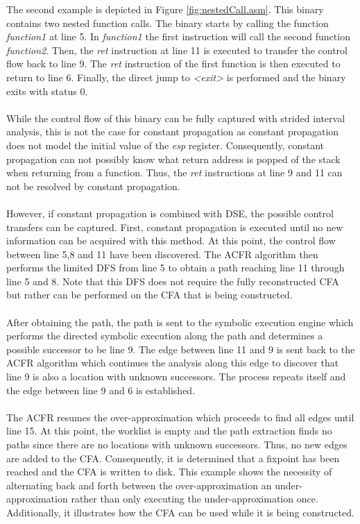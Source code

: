 \documentclass{kththesis}
\renewcommand{\it}[1]{\textit{#1}}
\begin{document}
\clearpage
\noindent
The second example is depicted in Figure \ref{fig:nestedCall.asm}. This binary contains two nested function calls. The binary starts by calling the function \it{function1} at line 5. In \it{function1} the first instruction will call the second function \it{function2}. Then, the \it{ret} instruction at line 11 is executed to transfer the control flow back to line 9. The \it{ret} instruction of the first function is then executed to return to line 6. Finally, the direct jump to \it{<exit>} is performed and the binary exits with status $0$.
\\ \\
While the control flow of this binary can be fully captured with strided interval analysis, this is not the case for constant propagation as constant propagation does not model the initial value of the \it{esp} register. Consequently, constant propagation can not possibly know what return address is popped of the stack when returning from a function. Thus, the \it{ret} instructions at line 9 and 11 can not be resolved by constant propagation. 
\\ \\
However, if constant propagation is combined with DSE, the possible control transfers can be captured. First, constant propagation is executed until no new information can be acquired with this method. At this point, the control flow between line 5,8 and 11 have been discovered. The ACFR algorithm then performs the limited DFS from line 5 to obtain a path reaching line 11 through line 5 and 8. Note that this DFS does not require the fully reconstructed CFA but rather can be performed on the CFA that is being constructed.
\\ \\
After obtaining the path, the path is sent to the symbolic execution engine which performs the directed symbolic execution along the path and determines a possible successor to be line 9. The edge between line 11 and 9 is sent back to the ACFR algorithm which continues the analysis along this edge to discover that line 9 is also a location with unknown successors. The process repeats itself and the edge between line 9 and 6 is established. 
\\ \\
The ACFR resumes the over-approximation which proceeds to find all edges until line 15. At this point, the worklist is empty and the path extraction finds no paths since there are no locations with unknown successors. Thus, no new edges are added to the CFA. Consequently, it is determined that a fixpoint has been reached and the CFA is written to disk. This example shows the necessity of alternating back and forth between the over-approximation an under-approximation rather than only executing the under-approximation once. Additionally, it illustrates how the CFA can be used while it is being constructed.
\end{document}
